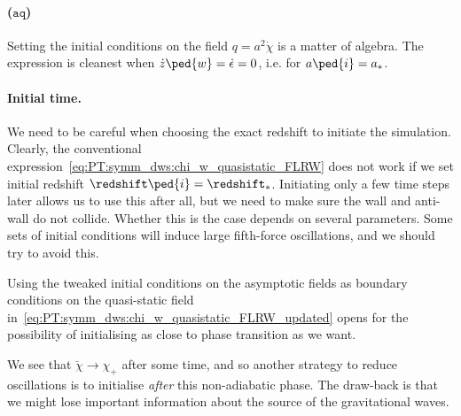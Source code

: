     \paragraph{($\mathtt{aq}$)} %
    Setting the initial conditions on the field $q = a^2 \dot{\chi}$ is a matter of algebra. The expression is cleanest when $\dot{z}\ped{w}=\dot{\epsilon}=0$, i.e. for $a\ped{i}=a_\ast$. %




    








    \paragraph{Initial time.} %
    We need to be careful when choosing the exact redshift to initiate the simulation. Clearly, the conventional expression~\cref{eq:PT:symm_dws:chi_w_quasistatic_FLRW} does not work if we set initial redshift $\redshift\ped{i}=\redshift_\ast$. Initiating only a few time steps later allows us to use this after all, but we need to make sure the wall and anti-wall do not collide. Whether this is the case depends on several parameters. Some sets of initial conditions will induce large fifth-force oscillations, and we should try to avoid this.

    Using the tweaked initial conditions on the asymptotic fields as boundary conditions on the quasi-static field in~\cref{eq:PT:symm_dws:chi_w_quasistatic_FLRW_updated} opens for the possibility of initialising as close to phase transition as we want. 
    
    We see that $\breve{\chi}\to \chi_+ $ after some time, and so another strategy to reduce oscillations is to initialise \emph{after} this non-adiabatic phase. The draw-back is that we might lose important information about the source of the gravitational waves.

